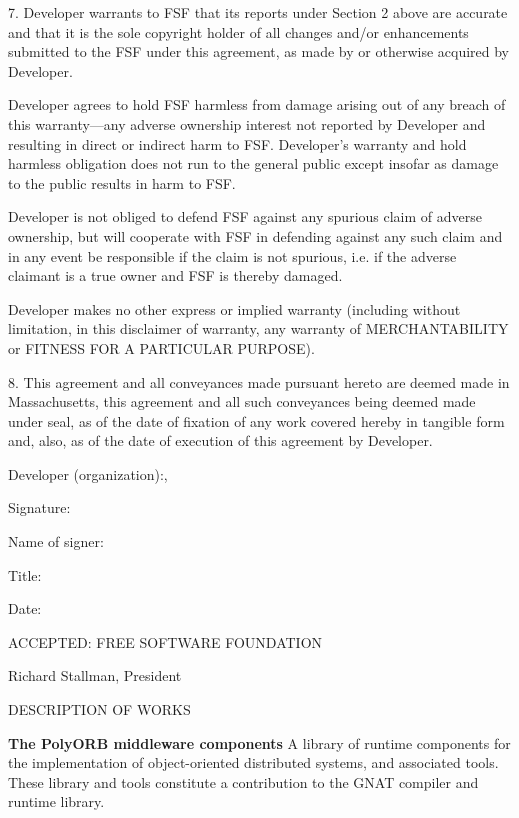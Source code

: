 \documentclass[a4paper,12pt]{article}
\begin{document}
 7. Developer warrants to FSF that its reports under Section 2 above
 are accurate and that it is the sole copyright holder of all changes
 and/or enhancements submitted to the FSF under this agreement, as made
 by or otherwise acquired by Developer.
 
 Developer agrees to hold FSF harmless from damage arising out of any
 breach of this warranty---any adverse ownership interest not reported
 by Developer and resulting in direct or indirect harm to FSF.
 Developer's warranty and hold harmless obligation does not run to the
 general public except insofar as damage to the public results in harm
 to FSF.
 
 Developer is not obliged to defend FSF against any spurious claim of
 adverse ownership, but will cooperate with FSF in defending against
 any such claim and in any event be responsible if the claim is not
 spurious, i.e. if the adverse claimant is a true owner and FSF is
 thereby damaged.
 
 Developer makes no other express or implied warranty (including
 without limitation, in this disclaimer of warranty, any warranty of
 MERCHANTABILITY or FITNESS FOR A PARTICULAR PURPOSE).
 
 8. This agreement and all conveyances made pursuant hereto are deemed
 made in Massachusetts, this agreement and all such conveyances being
 deemed made under seal, as of the date of fixation of any work covered
 hereby in tangible form and, also, as of the date of execution of this
 agreement by Developer.
 
          Developer (organization):\hrulefill,
 
         
 	 Signature:\hrulefill
 
 
          Name of signer:\hrulefill
 
 
          Title:\hrulefill
 
 
          Date:\hrulefill
 
 
 ACCEPTED: FREE SOFTWARE FOUNDATION
 
 Richard Stallman, President

\newpage
\centering DESCRIPTION OF WORKS
 
\vspace{2cm}

\begin{center}
\large 
{\bfseries The PolyORB middleware components}
A library of runtime components for the implementation
of object-oriented distributed systems, and associated
tools. These library and tools constitute a contribution
to the GNAT compiler and runtime library.
\end{center}
\end{document}
